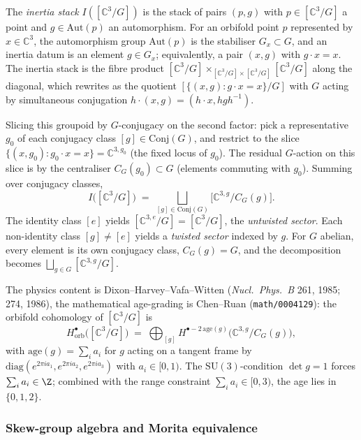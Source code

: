 The \emph{inertia stack} $I([\mathbb{C}^3/G])$ is the stack of pairs $(p, g)$ with $p \in [\mathbb{C}^3/G]$ a point and $g \in \mathrm{Aut}(p)$ an automorphism. For an orbifold point $p$ represented by $x \in \mathbb{C}^3$, the automorphism group $\mathrm{Aut}(p)$ is the stabiliser $G_x \subset G$, and an inertia datum is an element $g \in G_x$; equivalently, a pair $(x, g)$ with $g \cdot x = x$. The inertia stack is the fibre product $[\mathbb{C}^3/G] \times_{[\mathbb{C}^3/G] \times [\mathbb{C}^3/G]} [\mathbb{C}^3/G]$ along the diagonal, which rewrites as the quotient $[\{(x, g) : g \cdot x = x\} / G]$ with $G$ acting by simultaneous conjugation $h \cdot (x, g) = (h \cdot x, h g h^{-1})$.

Slicing this groupoid by $G$-conjugacy on the second factor: pick a representative $g_0$ of each conjugacy class $[g] \in \mathrm{Conj}(G)$, and restrict to the slice $\{(x, g_0) : g_0 \cdot x = x\} = \mathbb{C}^{3, g_0}$ (the fixed locus of $g_0$). The residual $G$-action on this slice is by the centraliser $C_G(g_0) \subset G$ (elements commuting with $g_0$). Summing over conjugacy classes,
\[
I\bigl([\mathbb{C}^3/G]\bigr) \;=\; \bigsqcup_{[g] \in \mathrm{Conj}(G)} \bigl[\mathbb{C}^{3, g}/C_G(g)\bigr].
\]
The identity class $[e]$ yields $[\mathbb{C}^{3, e}/G] = [\mathbb{C}^3/G]$, the \emph{untwisted sector}. Each non-identity class $[g] \neq [e]$ yields a \emph{twisted sector} indexed by $g$. For $G$ abelian, every element is its own conjugacy class, $C_G(g) = G$, and the decomposition becomes $\bigsqcup_{g \in G} [\mathbb{C}^{3, g}/G]$.

The physics content is Dixon--Harvey--Vafa--Witten (\emph{Nucl.\ Phys.\ B} 261, 1985; 274, 1986), the mathematical age-grading is Chen--Ruan (\texttt{math/0004129}): the orbifold cohomology of $[\mathbb{C}^3/G]$ is
\[
H^\bullet_{\mathrm{orb}}\bigl([\mathbb{C}^3/G]\bigr) \;=\; \bigoplus_{[g]} H^{\bullet - 2\,\mathrm{age}(g)}\bigl(\mathbb{C}^{3,g}/C_G(g)\bigr),
\]
with $\mathrm{age}(g) = \sum_i a_i$ for $g$ acting on a tangent frame by $\mathrm{diag}(e^{2\pi i a_1}, e^{2\pi i a_2}, e^{2\pi i a_3})$ with $a_i \in [0, 1)$. The $\mathrm{SU}(3)$-condition $\det g = 1$ forces $\sum_i a_i \in \Z$; combined with the range constraint $\sum_i a_i \in [0, 3)$, the age lies in $\{0, 1, 2\}$.

\subsubsection{Skew-group algebra and Morita equivalence}
\label{subsec:skew-group-morita}

